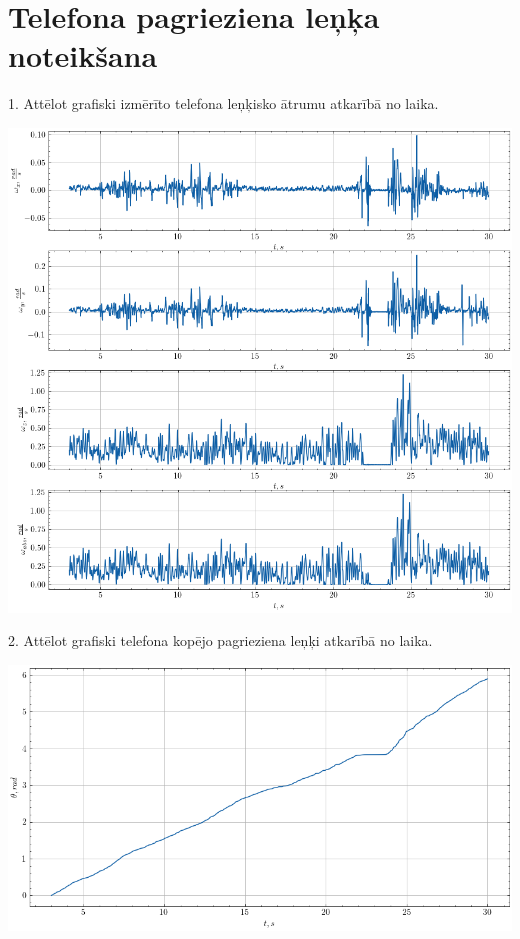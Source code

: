 \documentclass[12pt]{article}
\begin{document}
\newpage
\section*{Telefona pagrieziena leņķa noteikšana}

1.	Attēlot grafiski izmērīto telefona leņķisko ātrumu atkarībā no laika.

\begin{center}
    \includegraphics[width=1\textwidth]{Telefona pagrieziena leņķa noteikšana1.png}
\end{center}

2.	Attēlot grafiski telefona kopējo pagrieziena leņķi atkarībā no laika.

\begin{center}
    \includegraphics[width=1\textwidth]{Telefona pagrieziena leņķa noteikšana2.png}
\end{center}
\end{document}
